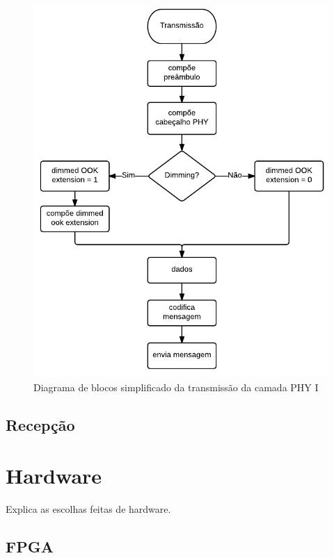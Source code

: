 	\begin{figure}[htb]
		\caption{\label{fig_transmission_simple_blocs} Diagrama de blocos simplificado da transmissão da camada PHY I}
		\centering
		\includegraphics[width=0.3\textheight]{transmissao-blocos-simplificado.pdf}
	\end{figure}
	
	\subsection{Recepção}
	
	\section{Hardware}\label{sec-hardware}
	
	Explica as escolhas feitas de hardware.
	
	\subsection{FPGA}\label{hard-fpga}
	
